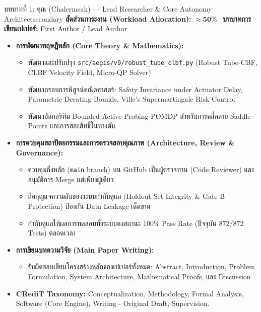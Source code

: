\documentclass[10pt,a4paper]{article}
\begin{document}
\begin{rolebox}{บทบาทที่ 1: คุณ (Chalermsak) — Lead Researcher \& Core Autonomy Architect}{secondary}
  \textbf{สัดส่วนภาระงาน (Workload Allocation):} $\approx \mathbf{50\%}$ \textbar\ \textbf{บทบาทการเขียนเปเปอร์:} First Author / Lead Author
  \begin{itemize}[leftmargin=12pt, itemsep=1pt, topsep=1pt, parsep=0pt]
    \item \textbf{การพัฒนาทฤษฎีหลัก (Core Theory \& Mathematics):}
      \begin{itemize}[itemsep=0.5pt, parsep=0pt]
        \item พัฒนาและปรับปรุง \texttt{src/aegis/v9/robust\_tube\_clbf.py} (Robust Tube-CBF, CLBF Velocity Field, Micro-QP Solver)
        \item พัฒนากรอบการพิสูจน์คณิตศาสตร์: Safety Invariance under Actuator Delay, Parametric Derating Bounds, Ville's Supermartingale Risk Control
        \item พัฒนาอัลกอริทึม Bounded Active Probing POMDP สำหรับการคลี่คลาย Saddle Points และการสละสิทธิ์ในทางตัน
      \end{itemize}
    \item \textbf{การควบคุมสถาปัตยกรรมและการตรวจสอบคุณภาพ (Architecture, Review \& Governance):}
      \begin{itemize}[itemsep=0.5pt, parsep=0pt]
        \item ควบคุมกิ่งหลัก (\texttt{main} branch) บน GitHub เป็นผู้ตรวจทาน (Code Reviewer) และอนุมัติการ Merge แต่เพียงผู้เดียว
        \item ถือกุญแจความลับของระบบกำกับดูแล (Holdout Set Integrity \& Gate B Protection) ป้องกัน Data Leakage เด็ดขาด
        \item กำกับดูแลให้ผลการทดสอบทั้งระบบคงสถานะ 100\% Pass Rate (ปัจจุบัน 872/872 Tests) ตลอดเวลา
      \end{itemize}
    \item \textbf{การเขียนบทความวิจัย (Main Paper Writing):}
      \begin{itemize}[itemsep=0.5pt, parsep=0pt]
        \item รับผิดชอบเขียนโครงสร้างหลักของเปเปอร์ทั้งหมด: Abstract, Introduction, Problem Formulation, System Architecture, Mathematical Proofs, และ Discussion
      \end{itemize}
    \item \textbf{CRediT Taxonomy:} Conceptualization, Methodology, Formal Analysis, Software (Core Engine), Writing - Original Draft, Supervision.
  \end{itemize}
\end{rolebox}
\end{document}
